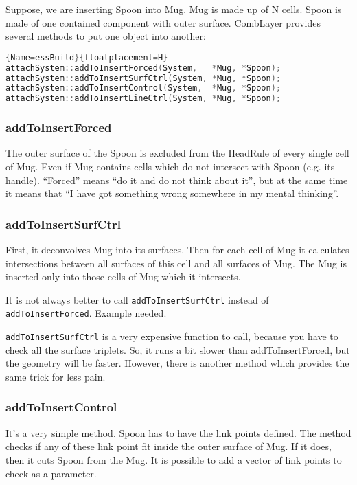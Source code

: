 Suppose, we are inserting Spoon into Mug.
Mug is made up of N cells. Spoon is made of one contained component with outer surface.
CombLayer provides several methods to put one object into another:

\begin{lstlisting}[language=C++]{Name=essBuild}{floatplacement=H}
attachSystem::addToInsertForced(System,   *Mug, *Spoon);
attachSystem::addToInsertSurfCtrl(System, *Mug, *Spoon);
attachSystem::addToInsertControl(System,  *Mug, *Spoon);
attachSystem::addToInsertLineCtrl(System, *Mug, *Spoon);
\end{lstlisting}

\subsubsection{addToInsertForced}
The outer surface of the Spoon is excluded from the HeadRule of every single cell of Mug.
Even if Mug contains cells which do not intersect with Spoon (e.g. its handle).
``Forced'' means ``do it and do not think about it'', but at the same time it means that ``I have got something wrong somewhere in my mental thinking''.

\subsubsection{addToInsertSurfCtrl}
First, it deconvolves Mug into its surfaces.
Then for each cell of Mug it calculates intersections between all surfaces of this cell and all surfaces of Mug.
The Mug is inserted only into those cells of Mug which it intersects.

It is not always better to call {\tt addToInsertSurfCtrl} instead of {\tt addToInsertForced}. \alert{Example needed.}

{\tt addToInsertSurfCtrl} is a very expensive function to call, because you have to check all the surface triplets. So, it runs a bit slower than addToInsertForced, but the geometry will be faster.
However, there is another method which provides the same trick for less pain.

\subsubsection{addToInsertControl}
It's a very simple method. Spoon has to have the link points defined.
The method checks if any of these link point fit inside the outer surface of Mug. If it does, then it cuts Spoon from the Mug.
It is possible to add a vector of link points to check as a parameter.

